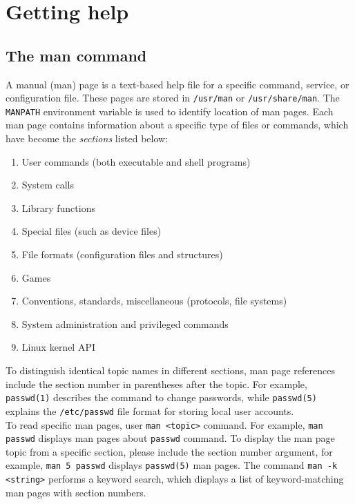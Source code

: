 \chapter{Getting help}

\section{The man command}

A manual (man) page is  a text-based help file for a specific command, service, or configuration file. These pages are stored in 	\verb|/usr/man| or \verb|/usr/share/man|. The \verb|MANPATH| environment variable is used to identify location of man pages. Each man page contains information about a specific type of files or commands, which have become the \emph{sections} listed below:

\begin{enumerate}
\item User commands (both executable and shell programs)
\item System calls
\item Library functions
\item Special files (such as device files)
\item File formats (configuration files and structures)
\item Games
\item Conventions, standards, miscellaneous (protocols, file systems)
\item System administration and privileged commands
\item Linux kernel API
\end{enumerate}

To distinguish identical topic names in different sections, man page references include the section number in parentheses after the topic. For example, \verb|passwd(1)| describes the command to change passwords, while \verb|passwd(5)| explains the \verb|/etc/passwd| file format for storing local user accounts.\\

To read specific man pages, user \verb|man <topic>| command. For example, \verb|man passwd| displays man pages about \verb|passwd| command. To display the man page topic from a specific section, please include the section number argument, for example, \verb|man 5 passwd| displays \verb|passwd(5)| man pages. The command \verb|man -k <string>| performs a keyword search, which displays a list of keyword-matching man pages with section numbers.

